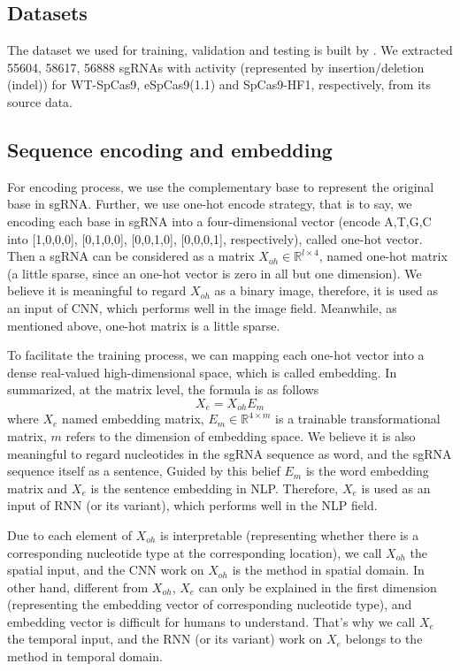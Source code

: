 \documentclass{bioinfo}
\begin{document}
\subsection{Datasets}

The dataset we used for training, validation and testing is built by \citeauthor{wang2019optimized}. 
We extracted 55604, 58617, 56888 sgRNAs with activity (represented by insertion/deletion (indel)) for WT-SpCas9, eSpCas9(1.1) and SpCas9-HF1, respectively, from its source data. 

\subsection{Sequence encoding and embedding}

For encoding process, we use the complementary base to represent the original base in sgRNA. 
Further, we use one-hot encode strategy, that is to say, we encoding each base in sgRNA into a four-dimensional vector 
(encode A,T,G,C into [1,0,0,0], [0,1,0,0], [0,0,1,0], [0,0,0,1], respectively), called one-hot vector. 
Then a sgRNA can be considered as a matrix $X_{oh}\in\mathbb{R}^{l\times4} $, named one-hot matrix (a little sparse, since an one-hot vector is zero in all but one dimension). 
We believe it is meaningful to regard $X_{oh}$ as a binary image, 
therefore, it is used as an input of CNN, which performs well in the image field.
Meanwhile, as mentioned above, one-hot matrix is a little sparse. 

To facilitate the training process, we can mapping each one-hot vector into a dense real-valued high-dimensional space, which is called embedding. 
In summarized, at the matrix level, the formula is as follows
\begin{equation}
X_e=X_{oh}E_m\label{eq:08}
\end{equation}
where $X_e$ named embedding matrix, $E_m\in\mathbb{R}^{4\times m}$ is a trainable transformational matrix, $m$ refers to the dimension of embedding space. 
We believe it is also meaningful to regard nucleotides in the sgRNA sequence as word, and the sgRNA sequence itself as a sentence, 
Guided by this belief $E_m$ is the word embedding matrix and $X_e$ is the sentence embedding in NLP.
Therefore, $X_e$ is used as an input of RNN (or its variant), which performs well in the NLP field.

Due to each element of $X_{oh}$ is interpretable (representing whether there is a corresponding nucleotide type at the corresponding location), 
we call $X_{oh}$ the spatial input, and the CNN work on $X_{oh}$ is the method in spatial domain. 
In other hand, different from $X_{oh}$, $X_e$ can only be explained in the first dimension (representing the embedding vector of corresponding nucleotide type), 
and embedding vector is difficult for humans to understand. 
That's why we call $X_e$ the temporal input, and the RNN (or its variant) work on $X_e$ belongs to the method in temporal domain. 
\end{document}
